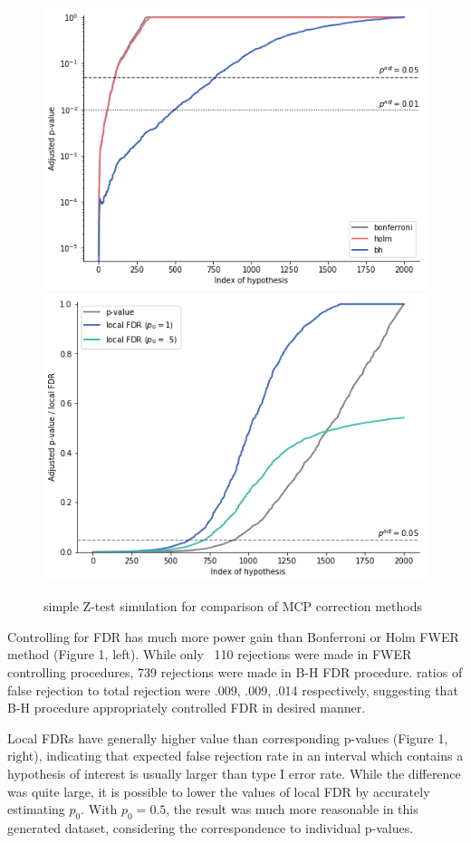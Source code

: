 \documentclass[a4paper, 11pt, oneside]{article}
\begin{document}
\begin{figure}[ht]
\centering
\includegraphics[scale=0.4]{adj_pval_report} 
\includegraphics[scale=0.4]{pval-lfdr_report}
\caption{simple Z-test simulation for comparison of MCP correction methods}
\end{figure}

Controlling for FDR has much more power gain than Bonferroni or Holm FWER method (Figure 1, left). While only ~110 rejections were made in FWER controlling procedures, 739 rejections were made in B-H FDR procedure. ratios of false rejection to total rejection were .009, .009, .014 respectively, suggesting that B-H procedure appropriately controlled FDR in desired manner. \par
    Local FDRs have generally higher value than corresponding p-values (Figure 1, right), indicating that expected false rejection rate in an interval which contains a hypothesis of interest is usually larger than type I error rate. While the difference was quite large, it is possible to lower the values of local FDR by accurately estimating $p_0$. With $p_0=0.5$, the result was much more reasonable in this generated dataset, considering the correspondence to individual p-values.
\end{document}
